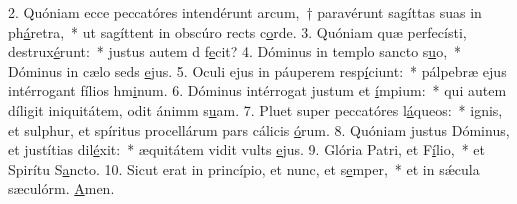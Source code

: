 2. Quóniam ecce peccatóres intendérunt arcum,~† paravérunt sagíttas suas in ph\uline{á}retra,~* ut sagíttent in obscúro rects c\uline{o}rde.
3. Quóniam quæ perfecísti, destrux\uline{é}runt:~* justus autem d f\uline{e}cit?
4. Dóminus in templo sancto s\uline{u}o,~* Dóminus in cælo seds \uline{e}jus.
5. Oculi ejus in páuperem resp\uline{í}ciunt:~* pálpebræ ejus intérrogant fílios hm\uline{i}num.
6. Dóminus intérrogat justum et \uline{í}mpium:~* qui autem díligit iniquitátem, odit ánimm s\uline{u}am.
7. Pluet super peccatóres l\uline{á}queos:~* ignis, et sulphur, et spíritus procellárum pars cálicis \uline{ó}rum.
8. Quóniam justus Dóminus, et justítias dil\uline{é}xit:~* æquitátem vidit vults \uline{e}jus.
9. Glória Patri, et F\uline{í}lio,~* et Spirítu S\uline{a}ncto.
10. Sicut erat in princípio, et nunc, et s\uline{e}mper,~* et in sǽcula sæculórm. \uline{A}men.
